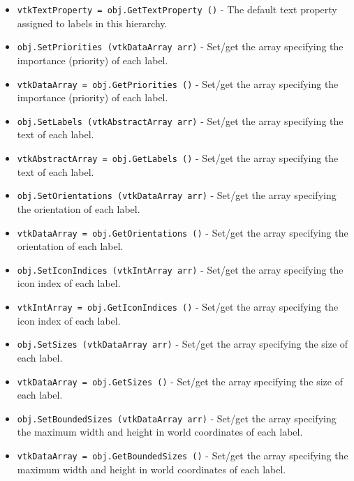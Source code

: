 \begin{itemize}
\item  \verb|vtkTextProperty = obj.GetTextProperty ()| -  The default text property assigned to labels in this hierarchy.

\item  \verb|obj.SetPriorities (vtkDataArray arr)| -  Set/get the array specifying the importance (priority) of each label.

\item  \verb|vtkDataArray = obj.GetPriorities ()| -  Set/get the array specifying the importance (priority) of each label.

\item  \verb|obj.SetLabels (vtkAbstractArray arr)| -  Set/get the array specifying the text of each label.

\item  \verb|vtkAbstractArray = obj.GetLabels ()| -  Set/get the array specifying the text of each label.

\item  \verb|obj.SetOrientations (vtkDataArray arr)| -  Set/get the array specifying the orientation of each label.

\item  \verb|vtkDataArray = obj.GetOrientations ()| -  Set/get the array specifying the orientation of each label.

\item  \verb|obj.SetIconIndices (vtkIntArray arr)| -  Set/get the array specifying the icon index of each label.

\item  \verb|vtkIntArray = obj.GetIconIndices ()| -  Set/get the array specifying the icon index of each label.

\item  \verb|obj.SetSizes (vtkDataArray arr)| -  Set/get the array specifying the size of each label.

\item  \verb|vtkDataArray = obj.GetSizes ()| -  Set/get the array specifying the size of each label.

\item  \verb|obj.SetBoundedSizes (vtkDataArray arr)| -  Set/get the array specifying the maximum width and height in world coordinates of each label.

\item  \verb|vtkDataArray = obj.GetBoundedSizes ()| -  Set/get the array specifying the maximum width and height in world coordinates of each label.


\end{itemize}
